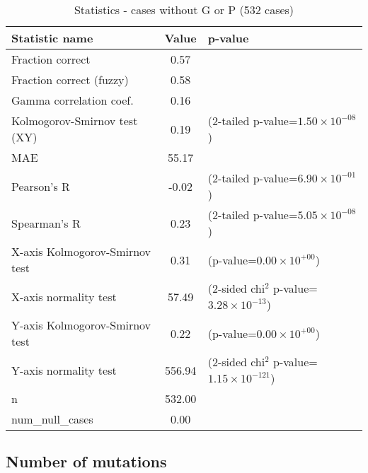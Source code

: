 \documentclass[10pt, letterpaper, oneside, titlepage, landscape]{scrreprt}
\begin{document}
\begin{table}[H]\begin{center}
\begin{tabular}{ l S[table-format=3.2] l}
Statistic name & {Value} & p-value\\
\hline
Fraction correct & 0.57 & \\
Fraction correct (fuzzy) & 0.58 & \\
Gamma correlation coef. & 0.16 & \\
Kolmogorov-Smirnov test (XY) & 0.19 & (2-tailed p-value=$1.50\times10^{-08}$)\\
MAE & 55.17 & \\
Pearson's R & -0.02 & (2-tailed p-value=$6.90\times10^{-01}$)\\
Spearman's R & 0.23 & (2-tailed p-value=$5.05\times10^{-08}$)\\
X-axis Kolmogorov-Smirnov test & 0.31 & (p-value=$0.00\times10^{+00}$)\\
X-axis normality test & 57.49 & (2-sided chi$^{2}$ p-value=$3.28\times10^{-13}$)\\
Y-axis Kolmogorov-Smirnov test & 0.22 & (p-value=$0.00\times10^{+00}$)\\
Y-axis normality test & 556.94 & (2-sided chi$^{2}$ p-value=$1.15\times10^{-121}$)\\
n & 532.00 & \\
num\_null\_cases & 0.00 & \\
\end{tabular}
\caption{Statistics - cases without G or P (532 cases)}
\end{center}\end{table}


\subsection{Number of mutations}
\end{document}
